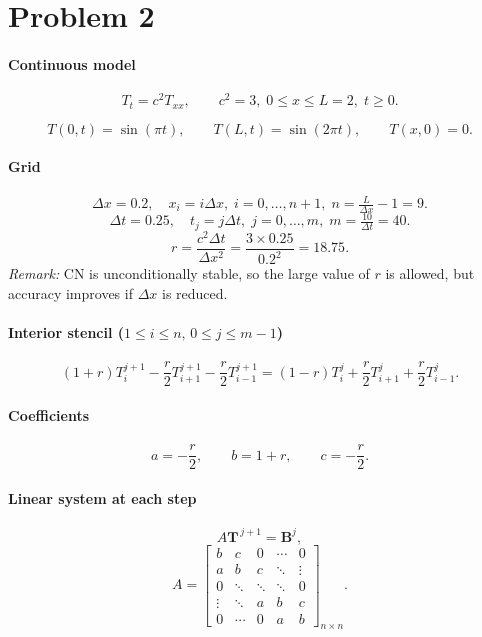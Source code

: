\documentclass{article}
\begin{document}
\newpage


\section*{Problem 2}

\paragraph{Continuous model}
\[
T_t=c^{2}T_{xx}, \qquad c^{2}=3,\; 0\le x\le L=2,\; t\ge0.
\]

\[
T(0,t)=\sin(\pi t), \qquad
T(L,t)=\sin(2\pi t), \qquad
T(x,0)=0.
\]

\paragraph{Grid}
\[
\Delta x=0.2,\quad x_i=i\Delta x,\; i=0,\dots,n+1,\; n=\tfrac{L}{\Delta x}-1=9.
\]
\[
\Delta t=0.25,\quad t_j=j\Delta t,\; j=0,\dots,m,\; m=\tfrac{10}{\Delta t}=40.
\]
\[
r=\frac{c^{2}\Delta t}{\Delta x^{2}}
     =\frac{3\times0.25}{0.2^{2}}
     =18.75.
\]
\emph{Remark:}\; CN is unconditionally stable, so the large value of \(r\) is allowed, but accuracy improves if \(\Delta x\) is reduced.

\paragraph{Interior stencil (\(1\le i\le n,\,0\le j\le m-1\))}
\[
(1+r)T_i^{j+1}-\frac{r}{2}T_{i+1}^{j+1}-\frac{r}{2}T_{i-1}^{j+1}
=(1-r)T_i^{j}+\frac{r}{2}T_{i+1}^{j}+\frac{r}{2}T_{i-1}^{j}.
\]

\paragraph{Coefficients}
\[
a=-\frac{r}{2},\qquad b=1+r,\qquad c=-\frac{r}{2}.
\]

\paragraph{Linear system at each step}
\[
A\mathbf T^{\,j+1}=\mathbf B^{j},
\]
\[
A=
\begin{bmatrix}
b & c & 0 & \cdots & 0\\
a & b & c & \ddots & \vdots\\
0 & \ddots & \ddots & \ddots & 0\\
\vdots & \ddots & a & b & c\\
0 & \cdots & 0 & a & b
\end{bmatrix}_{n\times n}.
\]
\end{document}
